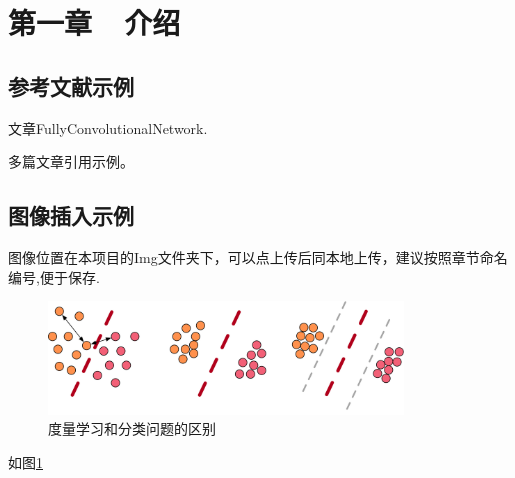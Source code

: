 \pagestyle{fancy}
\setcounter{page}{1}
\chead{}
\lfoot{}
\cfoot{\thepage}
\rfoot{}


\section*{第一章~~介绍}
\setcounter{section}{1} \setcounter{subsection}{0}

\subsection{参考文献示例}
\par 文章FullyConvolutionalNetwork.
\par 多篇文章引用示例。
\subsection{图像插入示例}
\par 图像位置在本项目的Img文件夹下，可以点上传后同本地上传，建议按照章节命名编号,便于保存.
\begin{figure}[!htbp]
    \centering    
    \includegraphics[height=3cm]{Img/c01_classification.png}
    \caption{度量学习和分类问题的区别}
    \label{classification}
\end{figure}
\par 如图\ref{classification}

\newpage

